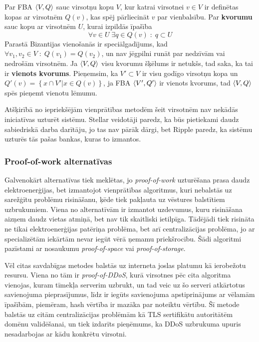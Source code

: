 Par FBA $\langle V,Q \rangle$ sauc virsotņu kopu $V$, kur katrai virsotnei $v\in V$ ir definētas kopas ar virsotnēm $Q(v)$, kas spēj pārliecināt $v$ par vienbalsību. Par \textbf{kvorumu} sauc kopu ar virsotnēm $U$, kurai izpildās īpašība
\begin{equation*}
    \forall v \in U \;\exists q \in Q(v) \;:\; q \subset U
\end{equation*}
Parastā Bizantijas vienošanās ir speciālgadījums, kad $\forall v_1,v_2\in V \;:\; Q(v_1) = Q(v_2)$, un nav jēgpilni runāt par nedzīvām vai nedrošām virsotnēm.
Ja $\langle V,Q \rangle$ visu kvorumu šķēlums ir netukšs, tad saka, ka tai ir \textbf{vienots kvorums}. Pieņemsim, ka $V'\subset V$ ir visu godīgo virsotņu kopa un $Q'(v) = \left\{ x\cap V' | x\in Q(v) \right\}$, ja FBA $\langle V',Q' \rangle$ ir vienots kvorums, tad $\langle V,Q \rangle$ spēs pieņemt vienotu lēmumu.\cite{mazieres15}

Atšķirībā no iepriekšējām vienprātības metodēm šeit virsotnēm nav nekādās iniciatīvas uzturēt sistēmu.
Stellar veidotāji paredz, ka būs pietiekami daudz sabiedriskā darba darītāju, jo tas nav pārāk dārgi, bet Ripple paredz, ka sistēmu uzturēs tās pašas bankas, kuras to izmantos.

\subsubsection{Proof-of-work alternatīvas}
Galvenokārt alternatīvas tiek meklētas, jo \textit{proof-of-work} uzturēšana prasa daudz elektroenerģijas, bet izmantojot vienprātības algoritmus, kuri nebalstās uz sarežģītu problēmu risināšanu, ķēde tiek pakļauta uz vēstures balstītiem uzbrukumiem. Viena no alternatīvām ir izmantot uzdevumus, kuru risināšana aizņem daudz vietas atmiņā, bet nav tik skaitliski ietilpīga.\cite{dziembowski15} Tādējādi tiek risināta ne tikai elektroenerģijas patēriņa problēma, bet arī centralizācijas problēma, jo ar specializētām iekārtām nevar iegūt vērā ņemamu priekšrocību. Šādi algoritmi pazīstami ar nosaukumu \textit{proof-of-space} vai \textit{proof-of-storage}.

Vēl citas savdabīgas metodes balstās uz interneta joslas platumu kā ierobežotu resursu. Viena no tām ir \textit{proof-of-DDoS}, kurā virsotnes pēc cita algoritma vienojas, kuram tīmekļa serverim uzbrukt, un tad veic uz šo serveri atkārtotus savienojuma pieprasījumus, līdz ir iegūts savienojuma apstiprinājums ar vēlamām īpašībām, piemēram, hash vērtība ir mazāka par noteiktu vērtību. Šī metode balstās uz citām centralizācijas problēmām kā TLS sertifikātu autoritātēm domēnu validēšanai, un tiek izdarīts pieņēmums, ka DDoS uzbrukuma upuris nesadarbojas ar kādu konkrētu virsotni.\cite{wustrow16}

